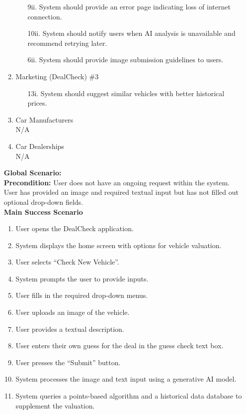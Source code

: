\documentclass[]{article}
\begin{document}
\begin{enumerate}[{\bf {BE}1.}]
\begin{enumerate}[{\bf VP1.}]
        \begin{enumerate}
          \item[9ii.] System should provide an error page indicating loss of internet connection.
          \item[10ii.] System should notify users when AI analysis is unavailable and recommend retrying later.
          \item[6ii.] System should provide image submission guidelines to users.
        \end{enumerate}
      \item Marketing (DealCheck) \#3
        \begin{enumerate}
          \item[13i.] System should suggest similar vehicles with better historical prices.
        \end{enumerate}
      \item Car Manufacturers \\ N/A
      \item Car Dealerships \\ N/A
    \end{enumerate}
    {\bf Global Scenario:}\\
    \textbf{Precondition:} User does not have an ongoing request within the system. User has provided an image and required textual input but has not filled out optional drop-down fields.\\
    \textbf{Main Success Scenario}
    \begin{enumerate}[1.]
      \item User opens the DealCheck application.
      \item System displays the home screen with options for vehicle valuation.
      \item User selects ``Check New Vehicle''.
      \item System prompts the user to provide inputs.
      \item User fills in the required drop-down menus.
      \item User uploads an image of the vehicle.
      \item User provides a textual description.
      \item User enters their own guess for the deal in the guess check text box.
      \item User presses the ``Submit'' button.
      \item System processes the image and text input using a generative AI model.
      \item System queries a points-based algorithm and a historical data database to supplement the valuation.

\end{enumerate}
\end{enumerate}
\end{document}
